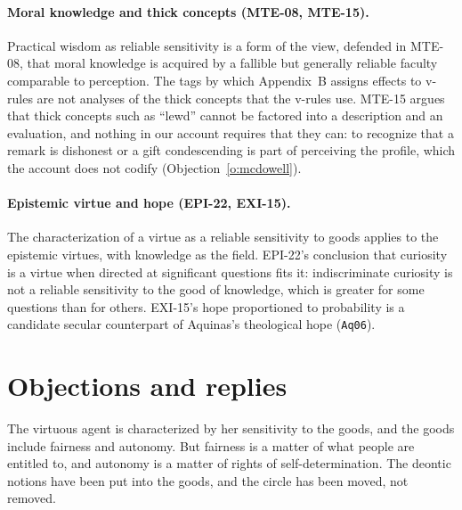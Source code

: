 \documentclass{situationist-preprint}
\begin{document}
\paragraph{Moral knowledge and thick concepts (MTE-08, MTE-15).} Practical wisdom as reliable sensitivity is a form of the view, defended in MTE-08, that moral knowledge is acquired by a fallible but generally reliable faculty comparable to perception. The tags by which Appendix~B assigns effects to v-rules are not analyses of the thick concepts that the v-rules use. MTE-15 argues that thick concepts such as \enquote{lewd} cannot be factored into a description and an evaluation, and nothing in our account requires that they can: to recognize that a remark is dishonest or a gift condescending is part of perceiving the profile, which the account does not codify (Objection~\ref{o:mcdowell}).

\paragraph{Epistemic virtue and hope (EPI-22, EXI-15).} The characterization of a virtue as a reliable sensitivity to goods applies to the epistemic virtues, with knowledge as the field. EPI-22's conclusion that curiosity is a virtue when directed at significant questions fits it: indiscriminate curiosity is not a reliable sensitivity to the good of knowledge, which is greater for some questions than for others. EXI-15's hope proportioned to probability is a candidate secular counterpart of Aquinas's theological hope (\texttt{Aq06}).

\section{Objections and replies}\label{s:objections}

\begin{objection}\label{o:circ}
The virtuous agent is characterized by her sensitivity to the goods, and the goods include fairness and autonomy. But fairness is a matter of what people are entitled to, and autonomy is a matter of rights of self-determination. The deontic notions have been put into the goods, and the circle has been moved, not removed.
\end{objection}
\end{document}
